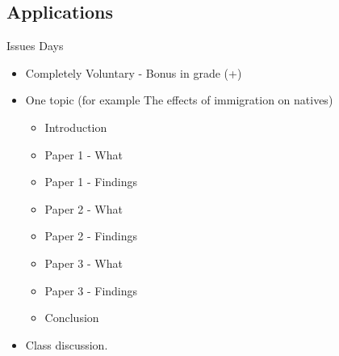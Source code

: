 \documentclass{beamer}
\newcommand{\1}{\mathbb{1}}
\begin{document}
\begin{frame}
\tableofcontents[currentsection] 
\end{frame}


\subsection{Applications}

\begin{frame}
\end{frame}

\begin{frame}{Issues Days}
\begin{itemize}
\item Completely Voluntary - Bonus in grade (+)
\item One topic (for example The effects of immigration on natives)
\begin{itemize}
\item Introduction 
\item Paper 1 - What
\item Paper 1 - Findings 
\item Paper 2 - What 
\item Paper 2 - Findings
\item Paper 3 - What
\item Paper 3 - Findings
\item Conclusion
\end{itemize}
\item Class discussion.
\end{itemize}
\end{frame}
\end{document}
